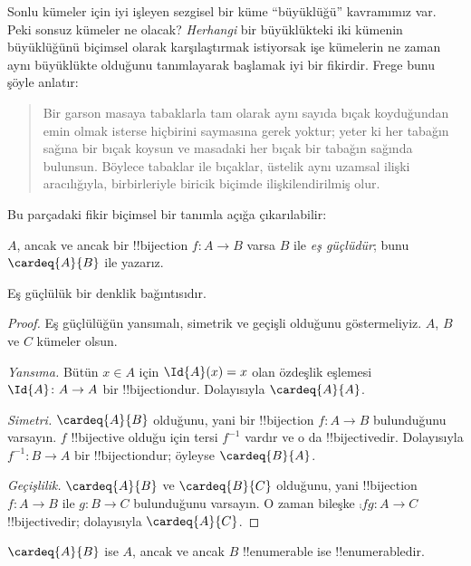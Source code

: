 \documentclass[../../../include/open-logic-section]{subfiles}
\begin{document}


Sonlu kümeler için iyi işleyen sezgisel bir küme ``büyüklüğü'' kavramımız
var. Peki sonsuz kümeler ne olacak? \emph{Herhangi} bir büyüklükteki iki
kümenin büyüklüğünü biçimsel olarak karşılaştırmak istiyorsak işe kümelerin
ne zaman aynı büyüklükte olduğunu tanımlayarak başlamak iyi bir fikirdir.
Frege bunu şöyle anlatır:
\begin{quote}
  Bir garson masaya tabaklarla tam olarak aynı sayıda bıçak koyduğundan emin
  olmak isterse hiçbirini saymasına gerek yoktur; yeter ki her tabağın sağına
  bir bıçak koysun ve masadaki her bıçak bir tabağın sağında bulunsun. Böylece
  tabaklar ile bıçaklar, üstelik aynı uzamsal ilişki aracılığıyla, birbirleriyle
  biricik biçimde ilişkilendirilmiş olur. \citep[\S70]{Frege1884}
\end{quote}
Bu parçadaki fikir biçimsel bir tanımla açığa çıkarılabilir:

\begin{defn}
  $A$, ancak ve ancak bir !!{bijection} $f\colon A\to B$ varsa $B$ ile
  \emph{eş güçlüdür}; bunu $\cardeq{A}{B}$ ile yazarız.
\end{defn}

\begin{prop}
Eş güçlülük bir denklik bağıntısıdır.
\end{prop}

\begin{proof}
Eş güçlülüğün yansımalı, simetrik ve geçişli olduğunu göstermeliyiz. $A$,
$B$ ve $C$ kümeler olsun.

\emph{Yansıma.} Bütün $x\in A$ için $\Id{A}(x)=x$ olan özdeşlik eşlemesi
$\Id{A}\colon A\to A$ bir !!{bijection}{}dur. Dolayısıyla $\cardeq{A}{A}$.

\emph{Simetri.} $\cardeq{A}{B}$ olduğunu, yani bir !!{bijection}
$f\colon A\to B$ bulunduğunu varsayın. $f$ !!{bijective} olduğu için tersi
$f^{-1}$ vardır ve o da !!{bijective}{}dir. Dolayısıyla $f^{-1}\colon B\to A$
bir !!{bijection}{}dur; öyleyse $\cardeq{B}{A}$.

\emph{Geçişlilik.} $\cardeq{A}{B}$ ve $\cardeq{B}{C}$ olduğunu, yani
!!{bijection} $f\colon A\to B$ ile $g\colon B\to C$ bulunduğunu varsayın.
O zaman bileşke $\comp{f}{g}\colon A\to C$ !!{bijective}{}dir; dolayısıyla
$\cardeq{A}{C}$.
\end{proof}

\begin{prop}
$\cardeq{A}{B}$ ise $A$, ancak ve ancak $B$ !!{enumerable} ise
!!{enumerable}{}dir.
\end{prop}
\end{document}
